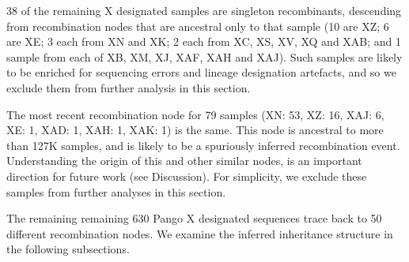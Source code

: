 \documentclass{article}
\begin{document}
38 of the remaining X designated samples are singleton recombinants, descending
from recombination nodes that are ancestral only to that sample (10 are XZ; 6
are XE;  3 each from XN and XK; 2 each from XC, XS, XV, XQ and XAB; and 1
sample from each of XB, XM, XJ, XAF, XAH and XAJ). Such samples are likely to
be enriched for sequencing errors and lineage designation artefacts, and so we
exclude them from further analysis in this section.

The most recent recombination node for 79 samples (XN: 53, XZ: 16, XAJ: 6, XE:
1, XAD: 1, XAH: 1, XAK: 1) is the same. This node is ancestral to more than
127K samples, and is likely to be a spuriously inferred recombination event.
Understanding the origin of this and other similar nodes, is an important
direction for future work (see Discussion). For simplicity, we exclude these
samples from further analyses in this section.

The remaining remaining 630 Pango X designated sequences trace back to 50
different recombination nodes. We examine the inferred inheritance structure in
the following subsections.


\end{document}
